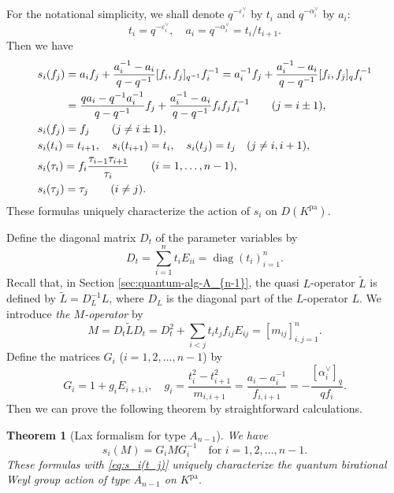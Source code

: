 \documentclass[12pt,twoside]{article}
\newcommand\tL{{\widetilde{L}}}
\newcommand\av{\alpha^\vee}
\newcommand\eps{\varepsilon}
\newcommand\epsv{\eps^\vee}
\newcommand\pa{{\mathrm{pa}}}
\newcommand\diag{\mathop{\mathrm{diag}}\nolimits}
\theoremstyle{plain} %
\newtheorem{theorem}{Theorem}
\theoremstyle{definition} %
\theoremstyle{definition} %
\numberwithin{theorem}{section}
\numberwithin{equation}{section}
\numberwithin{figure}{section}
\numberwithin{table}{section}
\newcommand\secref[1]{Section \ref{#1}}
\begin{document}
For the notational simplicity, we shall denote $q^{-\epsv_i}$ by $t_i$
and $q^{-\av_i}$ by $a_i$:
\begin{equation*}
 t_i = q^{-\epsv_i}, \quad 
 a_i = q^{-\av_i} = t_i/t_{i+1}.
\end{equation*}
Then we have
\begin{align}
  &
  s_i(f_j)
  = a_i      f_j + \frac{a_i^{-1}-a_i}{q-q^{-1}} [f_i,f_j]_{q^{-1}} f_i^{-1}
  = a_i^{-1} f_j + \frac{a_i^{-1}-a_i}{q-q^{-1}} [f_i,f_j]_q        f_i^{-1}
 \notag
 \\ &
  \hphantom{s_i(f_j)}
  = \frac{q a_i-q^{-1}a_i^{-1}}{q-q^{-1}} f_j 
  + \frac{a_i^{-1}-a_i}{q-q^{-1}} f_i f_j f_i^{-1}
  \qquad (j=i\pm1), 
 \label{eq:s_i(f_j)-1}
 \\ &
  s_i(f_j) = f_j 
  \qquad (j\ne i\pm 1),
 \label{eq:s_i(f_j)-2}
 \\ &
  s_i(t_i) = t_{i+1}, \quad
  s_i(t_{i+1}) = t_i, \quad
  s_i(t_j) = t_j \quad (j\ne i,i+1),
 \label{eq:s_i(t_j)}
 \\ &
  s_i(\tau_i) 
  = f_i\frac{\tau_{i-1}\tau_{i+1}}{\tau_i} 
  \qquad (i=1,\ldots,n-1),
 \notag
 \\ & 
  s_i(\tau_j) = \tau_j
  \qquad (i\ne j).
 \notag 
\end{align}
These formulas uniquely characterize the action of $s_i$ on $D(K^\pa)$.

Define the diagonal matrix $D_t$ of the parameter variables by 
\begin{equation*}
 D_t = \sum_{i=1}^n t_i E_{ii} = \diag(t_i)_{i=1}^n.
\end{equation*}
Recall that, in \secref{sec:quantum-alg-A_{n-1}}, 
the quasi $L$-operator $\tL$ is defined by $\tL=D_L^{-1}L$, 
where $D_L$ is the diagonal part of the $L$-operator $L$.
We introduce {\em the $M$-operator} by
\begin{equation*}
 M = D_t \tL D_t 
   = D_t^2 + \sum_{i<j}t_i t_j f_{ij}E_{ij}
   = [m_{ij}]_{i,j=1}^n.
\end{equation*}
Define the matrices $G_i$ ($i=1,2,\ldots,n-1$) by
\begin{equation*}
 G_i = 1 + g_i E_{i+1,i}, \quad
 g_i = \frac{t_i^2-t_{i+1}^2}{m_{i,i+1}}
     = \frac{a_i-a_i^{-1}}{f_{i,i+1}}
     = -\frac{[\av_i]_q}{q f_i}.
\end{equation*}
Then we can prove the following theorem by straightforward calculations.

\begin{theorem}[Lax formalism for type $A_{n-1}$]
\label{theorem:Lax-A_{n-1}}
 We have
 \begin{equation*}
   s_i(M)=G_i M G_i^{-1} \quad \text{for $i=1,2,\ldots,n-1$}.
 \end{equation*}
 These formulas with \eqref{eq:s_i(t_j)} uniquely characterize 
 the quantum birational Weyl group action of type $A_{n-1}$ 
 on $K^\pa$.
\end{theorem}
\end{document}
